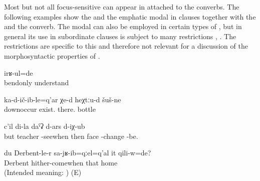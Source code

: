 Most but not all focus-sensitive  can appear in  attached to the converbs. The following examples show the    and the emphatic modal   in clauses together with the  and the  converb. The modal   can also be employed in certain types of , but in general its use in subordinate clauses is subject to many restrictions , . The restrictions are specific to this  and therefore not relevant for a discussion of the morphosyntactic properties of .
%
\begin{exe}
	\ex	\label{ex:‎‎‎I understood (everything) only wrongly)}
	\gll	[b-alk'-un-ne=cun]	irʁ-ul=de\\
		bendonly	understand\\
	\glt	{}

	\ex	\label{ex:Fallen down there are bottles there}
	\gll	ka-d-ič-ib-le=q'ar	χe-d	heχtːu-d	šuš-ne\\
		downoccur	exist.	there.	bottle\\
	\glt	{}

	
		\ex	\label{But when I saw the teacher, my face changed (i.e. turned red)}
		\gll	[a	učitil	či-w-až-ib=qːel=q'al]	c'il	di-la	daˁʡ d-ars	d-iχ-ub\\
			but	teacher	-seewhen	then		face \tsc{npl}-change 	-be.	\\
		\glt	{} 
	
		\ex	\label{ex:‎‎‎Was he at home when I came back from Derbent@B}
		\gll	{*} 	du		Derbent-le-r	sa-jʁ-ib=qːel=q'al	it	qili-w=de?\\
			{}		Derbent	hither-comewhen	that	home	\\
		\glt	(Intended meaning: ) (E)

\end{exe}

